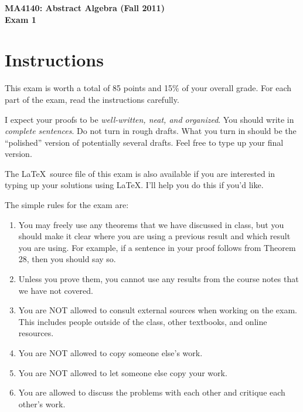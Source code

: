 \documentclass[11pt]{article}
\theoremstyle{definition}
\begin{document}
\begin{center}

{\Large\bf MA4140: Abstract Algebra (Fall 2011)}\\
\smallskip
{\Large\bf Exam 1}

\bigskip

  
  \bigskip
  

\end{center}

\setlength{\fboxsep}{10pt}

\section*{Instructions}

This exam is worth a total of 85 points and 15\% of your overall grade.  For each part of the exam, read the instructions carefully.

\bigskip

I expect your proofs to be \emph{well-written, neat, and organized}.  You should write in \emph{complete sentences}.  Do not turn in rough drafts.  What you turn in should be the ``polished'' version of potentially several drafts.  Feel free to type up your final version.  

\bigskip

The \LaTeX\ source file of this exam is also available if you are interested in typing up your solutions using \LaTeX.  I'll help you do this if you'd like.

\bigskip

The simple rules for the exam are:

\begin{enumerate}
\item You may freely use any theorems that we have discussed in class, but you should make it clear where you are using a previous result and which result you are using.  For example, if a sentence in your proof follows from Theorem 28, then you should say so.
\item Unless you prove them, you cannot use any results from the course notes that we have not covered.
\item You are NOT allowed to consult external sources when working on the exam.  This includes people outside of the class, other textbooks, and online resources.
\item You are NOT allowed to copy someone else's work.
\item You are NOT allowed to let someone else copy your work.
\item You are allowed to discuss the problems with each other and critique each other's work.
\end{enumerate}
\end{document}
